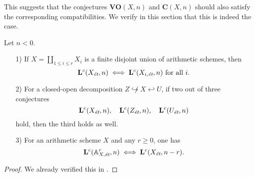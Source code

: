 \documentclass{article}
\numberwithin{equation}{section}
\begin{document}
This suggests that the conjectures $\mathbf{VO} (X,n)$ and $\mathbf{C} (X,n)$
should also satisfy the corresponding compatibilities. We verify in this section
that this is indeed the case.

\begin{lemma}
  \label{lemma:compatibility-of-Lc(X,n)}
  Let $n < 0$.

  \begin{enumerate}
  \item[1)] If $X = \coprod_{1 \le i \le r} X_i$ is a finite disjoint union of
    arithmetic schemes, then
    $$\mathbf{L}^c (X_\et,n) \iff \mathbf{L}^c (X_{i,\et},n)\text{ for all }i.$$

  \item[2)] For a closed-open decomposition
    $Z \not\hookrightarrow X \hookleftarrow U$, if two out of three conjectures
    \[ \mathbf{L}^c (X_\et,n), \quad
      \mathbf{L}^c (Z_\et,n), \quad
      \mathbf{L}^c (U_\et, n) \]
    hold, then the third holds as well.

  \item[3)] For an arithmetic scheme $X$ and any $r \ge 0$, one has
    $$\mathbf{L}^c (\AA^r_{X,\et}, n) \iff \mathbf{L}^c (X_\et, n-r).$$
  \end{enumerate}

  \begin{proof}
    We already verified this in \cite[Lemma~8.9]{Beshenov-Weil-etale-1}.
  \end{proof}
\end{lemma}
\end{document}
